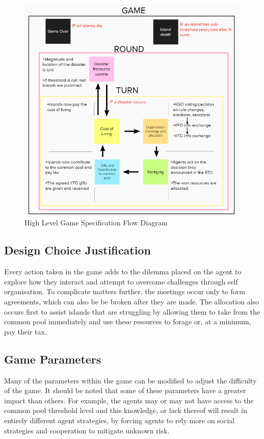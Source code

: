 \begin{figure}[!htb]
    \centering
    \includegraphics{03_gamedesign/images/gamespec-flow.png}
    \caption{High Level Game Specification Flow Diagram}
    \label{fig:gamedesign-flow}
\end{figure}

\subsection{Design Choice Justification}
Every action taken in the game adds to the dilemma placed on the agent to explore how they interact and attempt to overcome challenges through self organisation. To complicate matters further, the meetings occur only to form agreements, which can also be be broken after they are made. The allocation also occurs first to assist islands that are struggling by allowing them to take from the common pool immediately and use these resources to forage or, at a minimum, pay their tax.

\subsection{Game Parameters}
Many of the parameters within the game can be modified to adjust the difficulty of the game. It should be noted that some of these parameters have a greater impact than others. For example, the agents may or may not have access to the common pool threshold level and this knowledge, or lack thereof will result in entirely different agent strategies, by forcing agents to rely more on social strategies and cooperation to mitigate unknown risk.

